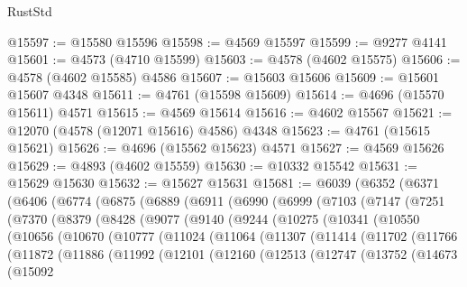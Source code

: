 \begin{lexlean}{RustStd}
\begin{coremodule}
@15597 := @15580 @15596
@15598 := @4569 @15597
@15599 := @9277 @4141
@15601 := @4573 (@4710 @15599)
@15603 := @4578 (@4602 @15575)
@15606 := @4578 (@4602 @15585) @4586
@15607 := @15603 @15606
@15609 := @15601 @15607 @4348
@15611 := @4761 (@15598 @15609)
@15614 := @4696 (@15570 @15611) @4571
@15615 := @4569 @15614
@15616 := @4602 @15567
@15621 := @12070 (@4578 (@12071 @15616) @4586) @4348
@15623 := @4761 (@15615 @15621)
@15626 := @4696 (@15562 @15623) @4571
@15627 := @4569 @15626
@15629 := @4893 (@4602 @15559)
@15630 := @10332 @15542
@15631 := @15629 @15630
@15632 := @15627 @15631
@15681 := @6039
    (@6352
      (@6371
        (@6406
          (@6774
            (@6875
              (@6889
                (@6911
                  (@6990
                    (@6999
                      (@7103
                        (@7147
                          (@7251
                            (@7370
                              (@8379
                                (@8428
                                  (@9077
                                    (@9140
                                      (@9244
                                        (@10275
                                          (@10341
                                            (@10550
                                              (@10656
                                                (@10670
                                                  (@10777
                                                    (@11024
                                                      (@11064
                                                        (@11307
                                                          (@11414
                                                            (@11702
                                                              (@11766
                                                                (@11872
                                                                  (@11886
                                                                    (@11992
                                                                      (@12101
                                                                        (@12160
                                                                          (@12513
                                                                            (@12747
                                                                              (@13752
                                                                                (@14673
                                                                                  (@15092

\end{coremodule}
\end{lexlean}
